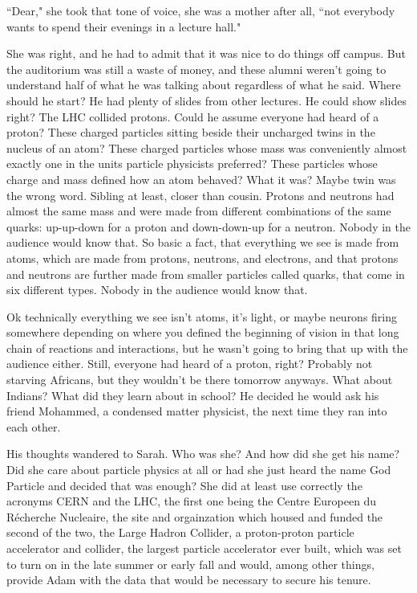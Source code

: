 ``Dear," she took that tone of voice, she was a mother after all, ``not everybody wants to spend their evenings in a lecture hall." 

\mypause

She was right, and he had to admit that it was nice to do things off campus. But the auditorium was still a waste of money, and these alumni weren't going to understand half of what he was talking about regardless of what he said. Where should he start? He had plenty of slides from other lectures. He could show slides right? The LHC collided protons. Could he assume everyone had heard of a proton? These charged particles sitting beside their uncharged twins in the nucleus of an atom? These charged particles whose mass was conveniently almost exactly one in the units particle physicists preferred? These particles whose charge and mass defined how an atom behaved? What it was? Maybe twin was the wrong word. Sibling at least, closer than cousin. Protons and neutrons had almost the same mass and were made from different combinations of the same quarks: up-up-down for a proton and down-down-up for a neutron. Nobody in the audience would know that. So basic a fact, that everything we see is made from atoms, which are made from protons, neutrons, and electrons, and that protons and neutrons are further made from smaller particles called quarks, that come in six different types. Nobody in the audience would know that.

 Ok technically everything we see isn't atoms, it's light, or maybe neurons firing somewhere depending on where you defined the beginning of vision in that long chain of reactions and interactions, but he wasn't going to bring that up with the audience either. Still, everyone had heard of a proton, right? Probably not starving Africans, but they wouldn't be there tomorrow anyways. What about Indians? What did they learn about in school? He decided he would ask his friend Mohammed, a condensed matter physicist, the next time they ran into each other.

 His thoughts wandered to Sarah. Who was she? And how did she get his name? Did she care about particle physics at all or had she just heard the name God Particle and decided that was enough? She did at least use correctly the acronyms CERN and the LHC, the first one being the Centre Europeen du Récherche Nucleaire, the site and orgainzation which housed and funded the second of the two, the Large Hadron Collider, a proton-proton particle accelerator and collider, the largest particle accelerator ever built, which was set to turn on in the late summer or early fall and would, among other things, provide Adam with the data that would be necessary to secure his tenure.

